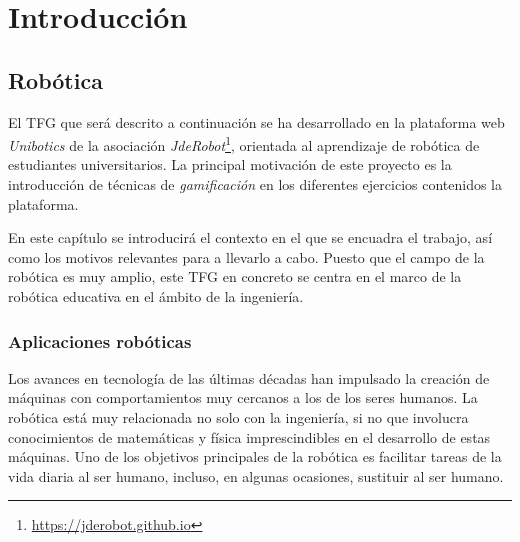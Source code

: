 \documentclass[a4paper, 12pt]{book}
\begin{document}
\tableofcontents 
\cleardoublepage
\listoffigures %



\cleardoublepage
\chapter{Introducción}
\label{sec:intro} %

\section{Robótica}
\label{sec:robotica}

El TFG que será descrito a continuación se ha desarrollado en la plataforma web \textit{Unibotics} de la asociación \textit{JdeRobot}\footnote{\url{https://jderobot.github.io}}, orientada al aprendizaje de robótica de estudiantes universitarios. La principal motivación de este proyecto es la introducción de técnicas de \emph{gamificación} en los diferentes ejercicios contenidos la plataforma.

En este capítulo se introducirá el contexto en el que se encuadra el trabajo, así como los motivos relevantes para a llevarlo a cabo. Puesto que el campo de la robótica es muy amplio, este TFG en concreto se centra en el marco de la robótica educativa en el ámbito de la ingeniería.

\subsection{Aplicaciones robóticas}
\label{sec:apps_roboticas}


Los avances en tecnología de las últimas décadas han impulsado la creación de máquinas con comportamientos muy cercanos a los de los seres humanos. La robótica está muy relacionada no solo con la ingeniería, si no que involucra conocimientos de matemáticas y física imprescindibles en el desarrollo de estas máquinas. Uno de los objetivos principales de la robótica es facilitar tareas de la vida diaria al ser humano, incluso, en algunas ocasiones, sustituir al ser humano.
\end{document}
